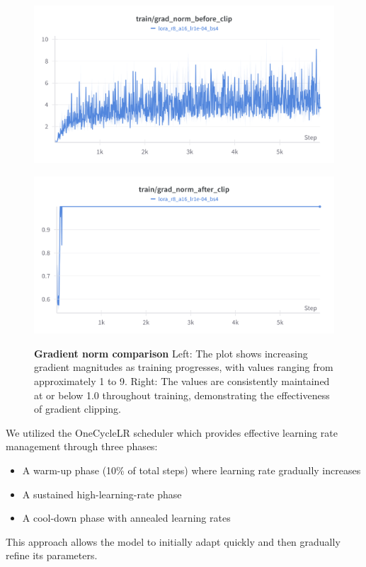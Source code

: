 \documentclass{article}
\begin{document}
\begin{figure}[h]
    \centering
    \begin{minipage}{0.48\textwidth}
        \centering
        \includegraphics[width=\textwidth]{before}
        \label{fig:first_label}
    \end{minipage}
    \hfill
    \begin{minipage}{0.48\textwidth}
        \centering
        \includegraphics[width=\textwidth]{after}
        \label{fig:second_label}
    \end{minipage}
    \caption{\textbf{Gradient norm comparison} Left: The plot shows increasing gradient magnitudes as training progresses, with values ranging from approximately 1 to 9. Right: The values are consistently maintained at or below 1.0 throughout training, demonstrating the effectiveness of gradient clipping.}
\end{figure}
We utilized the OneCycleLR scheduler which provides effective learning rate management through three phases:
\begin{itemize}
    \item A warm-up phase (10\% of total steps) where learning rate gradually increases
    \item  A sustained high-learning-rate phase
    \item  A cool-down phase with annealed learning rates   
\end{itemize}
This approach allows the model to initially adapt quickly and then gradually refine its parameters.
\end{document}
